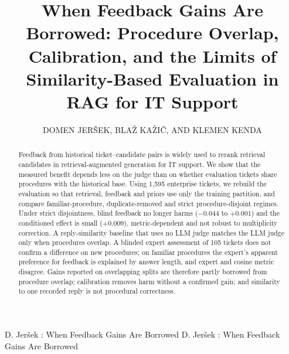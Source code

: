 \documentclass{ieeeaccess}
\begin{document}

\title{When Feedback Gains Are Borrowed: Procedure Overlap, Calibration, and the Limits of Similarity-Based Evaluation in RAG for IT Support}
\author{\uppercase{Domen Jer\v{s}ek},
\uppercase{Bla\v{z} Ka\v{z}i\v{c}}, AND \uppercase{Klemen Kenda}}

\address[1]{ARTIFICIAL INTELLIGENCE DEPARTMENT - E3, Jo\v{z}ef Stefan Institute, Ljubljana, Slovenia
(e-mail: domenjersek@gmail.com, blaz.kazic@ijs.si, klemen.kenda@ijs.si). ORCID: D. Jer\v{s}ek 0009-0009-1822-8277, B.
Ka\v{z}i\v{c} 0000-0002-1335-7960, K. Kenda 0000-0002-4918-0650.}


\markboth
{D. Jer\v{s}ek \headeretal: When Feedback Gains Are Borrowed}
{D. Jer\v{s}ek \headeretal: When Feedback Gains Are Borrowed}


\begin{abstract}
Feedback from historical ticket--candidate pairs is widely used to rerank retrieval
candidates in retrieval-augmented generation for IT support. We show that the
measured benefit depends less on the judge than on whether evaluation tickets share
procedures with the historical base. Using 1,595 enterprise tickets, we rebuild the
evaluation so that retrieval, feedback and priors use only the training partition,
and compare familiar-procedure, duplicate-removed and strict
procedure-disjoint regimes. Under strict disjointness, blind feedback no longer
harms ($-0.044$ to $+0.001$) and the conditioned effect is small ($+0.009$),
metric-dependent and not robust to multiplicity correction. A reply-similarity baseline that uses no LLM judge matches the LLM judge only
when procedures overlap. A blinded expert
assessment of 105 tickets does not confirm a difference on new procedures; on familiar
procedures the expert's apparent preference for feedback is explained by answer
length, and expert and cosine metric disagree. Gains reported on overlapping splits
are therefore partly borrowed from procedure overlap; calibration removes harm
without a confirmed gain; and similarity to one recorded reply is not procedural
correctness.
\end{abstract}
\end{document}
